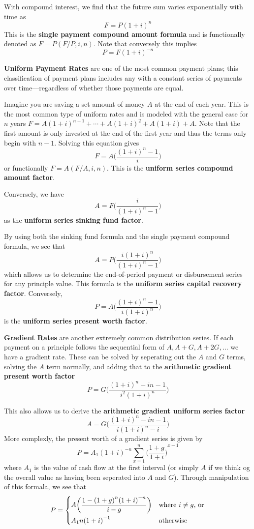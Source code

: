\documentclass[12pt]{article}
\begin{document}

With compound interest, we find that the future sum varies exponentially with time as \[ F = P{(1 + i)}^n \] This is the {\bf single payment compound amount formula} and is functionally denoted as $F = P(F/P, i, n)$. Note that conversely this implies \[ P = F{(1 + i)}^{-n} \]

{\bf Uniform Payment Rates} are one of the most common payment plans; this classification of payment plans includes any with a constant series of payments over time---regardless of whether those payments are equal.

Imagine you are saving a set amount of money $A$ at the end of each year. This is the most common type of uniform rates and is modeled with the general case for $n$ years $F = A{(1 + i)}^{n-1} + \cdots + A{(1 + i)}^2 + A{(1 + i)} + A$. Note that the first amount is only invested at the end of the first year and thus the terms only begin with $n-1$. Solving this equation gives \[ F = A \bigg( \frac{{(1 + i)}^n - 1}{i} \bigg) \] or functionally $F = A(F / A, i, n)$. This is the {\bf uniform series compound amount factor}.

Conversely, we have \[ A = F\bigg( \frac{i}{{(1 + i)}^n - 1} \bigg) \] as the {\bf uniform series sinking fund factor}.

By using both the sinking fund formula and the single payment compound formula, we see that \[ A = P \bigg( \frac{i{(1 + i)}^n}{{(1 + i)}^n - 1} \bigg) \] which allows us to determine the end-of-period payment or disbursement series for any principle value. This formula is the {\bf uniform series capital recovery factor}. Conversely, \[ P = A \bigg( \frac{{(1 + i)}^n - 1}{i{(1 + i)}^n} \bigg) \] is the {\bf uniform series present worth factor}.

{\bf Gradient Rates} are another extremely common distribution series. If each payment on a principle follows the sequential form of $A, A+G, A+2G, \dots$ we have a gradient rate. These can be solved by seperating out the $A$ and $G$ terms, solving the $A$ term normally, and adding that to the {\bf arithmetic gradient present worth factor} \[ P = G \bigg( \frac{{(1 + i)}^n - in - 1}{i^2 {(1 + i)}^n} \bigg) \]

This also allows us to derive the {\bf arithmetic gradient uniform series factor} \[ A = G \bigg( \frac{{(1+i)}^n -in - 1}{i{(1+i)}^n - i} \bigg) \] More complexly, the present worth of a gradient series is given by \[ P = A_1{(1 + i)}^{-n} \sum_{x=1}^n {\bigg( \frac{1+g}{1+i} \bigg)}^{x-1} \] where $A_1$ is the value of cash flow at the first interval (or simply $A$ if we think og the overall value as having been seperated into $A$ and $G$). Through manipulation of this formala, we see that \[ P =
\begin{dcases*}
A \bigg( \frac{1 - {(1+g)}^n {(1 + i)}^{-n}}{i-g} \bigg) & where $i \neq g$, or\\
A_1n{(1+i)}^{-1} & otherwise
\end{dcases*}
\]
\end{document}
